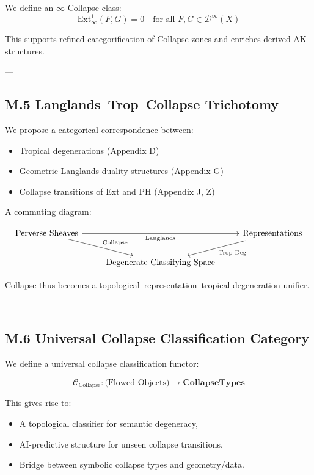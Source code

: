 \documentclass[11pt]{article}
\begin{document}
\begin{axiom}
\begin{axiom}
{{We define an $\infty$-Collapse class:
\[
\mathrm{Ext}^1_\infty(F,G) = 0 \quad \text{for all } F,G \in \mathcal{D}^\infty(X)
\]

This supports refined categorification of Collapse zones and enriches derived AK-structures.

---

\subsection*{M.5 Langlands–Trop–Collapse Trichotomy}

We propose a categorical correspondence between:

\begin{itemize}
  \item Tropical degenerations (Appendix D)
  \item Geometric Langlands duality structures (Appendix G)
  \item Collapse transitions of Ext and PH (Appendix J, Z)
\end{itemize}

A commuting diagram:

\[
\begin{tikzcd}
\text{Perverse Sheaves} \arrow[dr, "\text{Collapse}"] \arrow[rr, "\text{Langlands}"'] & & \text{Representations} \arrow[dl, "\text{Trop Deg}"] \\
& \text{Degenerate Classifying Space} &
\end{tikzcd}
\]

Collapse thus becomes a topological–representation–tropical degeneration unifier.

---

\subsection*{M.6 Universal Collapse Classification Category}

We define a universal collapse classification functor:

\[
\mathcal{C}_{\text{Collapse}} : \text{(Flowed Objects)} \to \mathbf{CollapseTypes}
\]

This gives rise to:

\begin{itemize}
  \item A topological classifier for semantic degeneracy,
  \item AI-predictive structure for unseen collapse transitions,
  \item Bridge between symbolic collapse types and geometry/data.
\end{itemize}

}}
\end{axiom}
\end{axiom}
\end{document}
